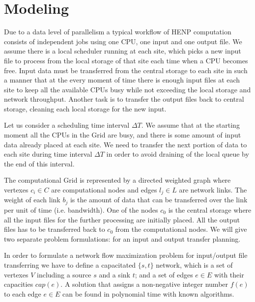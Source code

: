 \documentclass{svjour3}                     %
\begin{document}
\section{Modeling}
\label{modeling}
Due to a data level of parallelism a typical workflow of HENP computation
consists of independent jobs using one CPU, one input and one output file. We
assume there is a local scheduler running at each site, which picks a new
input file to process from the local storage of that site each time when a CPU becomes
free. Input data must be transferred from the central storage
to each site in such a manner that at the every moment of time there is enough
input files at each site to keep all the available CPUs busy while not
exceeding the local storage and network throughput. Another task
is to transfer the output files back to central storage, cleaning each local
storage for the new input.

Let us consider a scheduling time interval $\Delta T$. We assume that at the
starting moment all the CPUs in the Grid are busy, and there is some amount of
input data already placed at each site. We need to transfer the next portion
of data to each site during time interval $\Delta T$ in order to avoid
draining of the local queue by the end of this interval. 

The computational Grid is represented by a directed weighted graph where
vertexes $c_{i} \in C$ are computational nodes and edges $l_{j} \in L$ are
network links. The weight of each link $b_{j}$ is the amount of data that can be
transferred over the link per unit of time (i.e. bandwidth). One of the nodes
$c_{0}$ is the central storage where all the input files for the further
processing are initially placed. All the output files has to be transferred
back to $c_{0}$ from the computational nodes. We will give two separate
problem formulations: for an input and output transfer planning. 

In order to formulate a network flow maximization problem \cite{Network_flows}
for input/output file transferring we have to define a capacitated $\{s,t\}$
network, which is a set of vertexes $V$ including a source $s$ and a sink $t$;
and a set of edges $e\in E$ with their capacities $cap(e)$. A solution that
assigns a non-negative integer number $f(e)$ to each edge $e \in E$ can be
found in polynomial time with known algorithms.
\end{document}
